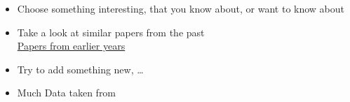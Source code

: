 \documentclass[a4paper,landscape,headrule,footrule,xetex]{foils}
\begin{document}

\begin{itemize}
\item Choose something interesting, that you know about, or want to know about
\item Take a look at similar papers from the past
  \\ \href{https://bond-lab.github.io/Language-Technology-and-the-Internet/papers/ass1.html}{Papers from earlier years}
\item Try to add something new, \ldots

\end{itemize}



\begin{itemize}
\item Much Data taken from \citet[ch 2,4--5,8]{Crystal:2006}
\end{itemize}



\end{document}
